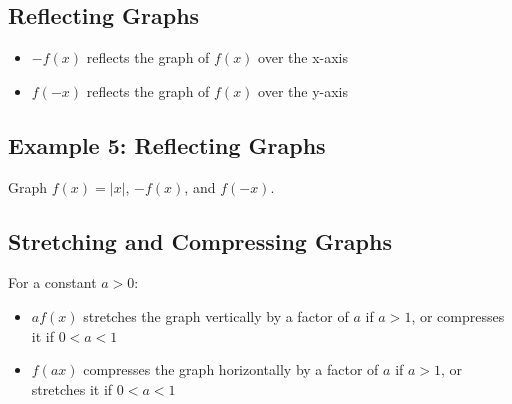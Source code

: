 \documentclass[12pt]{article}
\begin{document}
\subsection{Reflecting Graphs}

\begin{itemize}
    \item $-f(x)$ reflects the graph of $f(x)$ over the x-axis
    \item $f(-x)$ reflects the graph of $f(x)$ over the y-axis
\end{itemize}

\subsection{Example 5: Reflecting Graphs}

Graph $f(x) = |x|$, $-f(x)$, and $f(-x)$.

\begin{center}
\end{center}

\subsection{Stretching and Compressing Graphs}

For a constant $a > 0$:
\begin{itemize}
    \item $af(x)$ stretches the graph vertically by a factor of $a$ if $a > 1$, or compresses it if $0 < a < 1$
    \item $f(ax)$ compresses the graph horizontally by a factor of $a$ if $a > 1$, or stretches it if $0 < a < 1$
\end{itemize}
\end{document}
